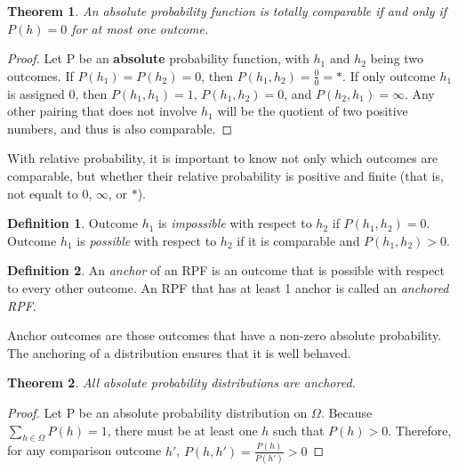 \documentclass[twoside]{article}
\theoremstyle{plain}%
\newtheorem{theorem}{Theorem}[section]
\theoremstyle{definition}
\newtheorem{definition}{Definition}[section]
\theoremstyle{remark}
\begin{document}
\begin{theorem}
\label{thm:abs_totally_comparable}
An absolute probability function is totally comparable if and only if \(P(h) = 0\) for at most one outcome.
\end{theorem}

\begin{proof}
Let P be an \textbf{absolute} probability function, with \(h_1\) and \(h_2\) being two outcomes. If \(P(h_1) = P(h_2) = 0\), then \(P(h_1, h_2) = \frac{0}{0} = \ast\). If only outcome \(h_1\) is assigned 0, then \(P(h_1, h_1) = 1\), \(P(h_1, h_2) = 0\), and \(P(h_2, h_1) = \infty\). Any other pairing that does not involve \(h_1\) will be the quotient of two positive numbers, and thus is also comparable.
\end{proof}

With relative probability, it is important to know not only which outcomes are comparable, but whether their relative probability is positive and finite (that is, not equalt to 0, \(\infty\), or \(\ast\)).

\begin{definition}
Outcome \(h_1\) is \textit{impossible} with respect to \(h_2\) if \(P(h_1, h_2) = 0\). Outcome \(h_1\) is \textit{possible} with respect to \(h_2\) if it is comparable and \(P(h_1, h_2) > 0\).
\end{definition}

\begin{definition}
\label{def:anchored_rpf}
An \textit{anchor} of an RPF is an outcome that is possible with respect to every other outcome. An RPF that has at least 1 anchor is called an \textit{anchored RPF}.
\end{definition}

Anchor outcomes are those outcomes that have a non-zero absolute probability. The anchoring of a distribution ensures that it is well behaved.

\begin{theorem}
\label{thm:absolute_anchored}
All absolute probability distributions are anchored.
\end{theorem}

\begin{proof}
Let P be an absolute probability distribution on \(\Omega\). Because \(\sum_{h \in \Omega} P(h) = 1\), there must be at least one \(h\) such that \(P(h) > 0\).  Therefore, for any comparison outcome \(h'\), \(P(h, h') = \frac{P(h)}{P(h')} > 0\)
\end{proof}
\end{document}
